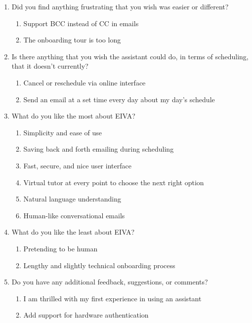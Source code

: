 \documentclass{article}
\begin{document}
\begin{enumerate}
	\item Did you find anything frustrating that you wish was easier or different?
		\begin{enumerate}
			\item Support BCC instead of CC in emails
			\item The onboarding tour is too long
		\end{enumerate}
	\item Is there anything that you wish the assistant could do, in terms of scheduling, that it doesn't currently?
		\begin{enumerate}
			\item Cancel or reschedule via online interface
			\item Send an email at a set time every day about my day's schedule
		\end{enumerate}
	\item What do you like the most about EIVA?
		\begin{enumerate}
			\item Simplicity and ease of use
			\item Saving back and forth emailing during scheduling
			\item Fast, secure, and nice user interface
			\item Virtual tutor at every point to choose the next right option
			\item Natural language understanding
			\item Human-like conversational emails
		\end{enumerate}
	\item What do you like the least about EIVA?
		\begin{enumerate}
			\item Pretending to be human
			\item Lengthy and slightly technical onboarding process
		\end{enumerate}
	\item Do you have any additional feedback, suggestions, or comments?
		\begin{enumerate}
			\item I am thrilled with my first experience in using an assistant
			\item Add support for hardware authentication
		\end{enumerate}
\end{enumerate}

\newpage
\end{document}
